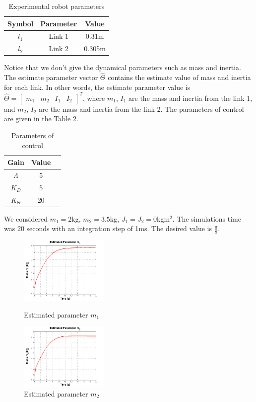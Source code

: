 \begin{table}[h]
\centering
\caption{Experimental robot parameters}
\label{tab1}
\begin{tabular}{|c|c|c|}
\hline
\bf{Symbol}&\bf{Parameter}&\bf{Value}\\\hline
$l_1$&Link 1&0.31m\\\hline
$l_2$&Link 2&0.305m\\\hline
\end{tabular}
\end{table}

Notice that we don't give the dynamical parameters such as mass and inertia. The estimate parameter vector $\hat{\Theta}$ contains the estimate value of mass and inertia for each link. In other words, the estimate parameter value is $\hat{\Theta}=\left[\begin{array}{cccc}m_1&m_2&I_1&I_2\end{array}\right]^T$, where $m_1$, $I_1$ are the mass and inertia from the link 1, and $m_2$, $I_2$ are the mass and inertia from the link 2. The parameters of control are given in the Table \ref{tab2}.

\begin{table}[h]
\centering
\caption{Parameters of control}
\label{tab2}
\begin{tabular}{|c|c|c|}
\hline
\bf{Gain}&\bf{Value}\\\hline
$\Lambda$&5\\\hline
$K_D$&5\\\hline
$K_\Theta$&20\\\hline
\end{tabular}
\end{table}

We considered $m_1=2$kg, $m_2=3{.}5$kg, $J_1=J_2=0$kg$\mbox{m}^2$. The simulations time was 20 seconds with an integration step of 1ms. The desired value is $\frac{\pi}{8}$.\\

\begin{figure}[h]
\centering
\includegraphics[width=0.38\textwidth]{imagenes/6-neuronal/m1.png}
 \caption{Estimated parameter $m_1$}
 \label{fig:m1}
 \includegraphics[width=0.38\textwidth]{imagenes/6-neuronal/m2.png}
 \caption{Estimated parameter $m_2$}
 \label{fig:m2}
\end{figure}

